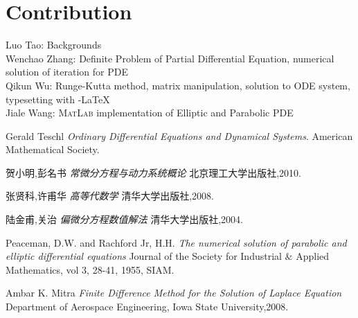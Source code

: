 \documentclass[a4paper]{article}
\newcommand{\tmtextit}[1]{{\itshape{#1}}}
\begin{document}
\section{Contribution}
Luo Tao: Backgrounds
\\Wenchao Zhang: Definite Problem of Partial Differential Equation, numerical solution of iteration for PDE
\\Qikun Wu: Runge-Kutta method, matrix manipulation, solution to ODE system, typesetting with \AmS -\LaTeX
\\Jiale Wang: \textsc{MatLab} implementation of Elliptic and Parabolic PDE

\begin{thebibliography}{11}

  Gerald Teschl{\newblock} \tmtextit
  {Ordinary Differential Equations and Dynamical Systems}.{\newblock}  American Mathematical Society.{\newblock}

  贺小明,彭名书{\newblock} \tmtextit
  {常微分方程与动力系统概论}{\newblock}
  北京理工大学出版社,2010.{\newblock}

  张贤科,许甫华{\newblock} \tmtextit
  {高等代数学}{\newblock}
  清华大学出版社,2008.{\newblock}
  
  陆金甫,关治{\newblock} \tmtextit
  {偏微分方程数值解法}{\newblock}
  清华大学出版社,2004.{\newblock}
  
  Peaceman, D.W. and Rachford Jr, H.H.{\newblock} \tmtextit
  {The numerical solution of parabolic and elliptic differential equations}{\newblock}
  Journal of the Society for Industrial \& Applied Mathematics, vol 3, 28-41, 1955, SIAM.{\newblock}
  
  Ambar K. Mitra{\newblock} \tmtextit
  {Finite Difference Method for the Solution of Laplace Equation}{\newblock}
  Department of Aerospace Engineering, Iowa State University,2008.{\newblock}

\end{thebibliography}
\end{document}
